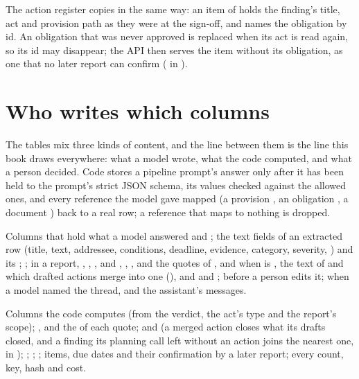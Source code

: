 The action register copies in the same way: an item of  holds the
finding's title, act and provision path as they were at the sign-off, and names the obligation
by id. An obligation that was never approved is replaced when its act is read again, so its id
may disappear; the API then serves the item without its obligation, as one that no later
report can confirm ( in ).

\section{Who writes which columns}\label{sec:data:writers}

The tables mix three kinds of content, and the line between them is the line this book draws
everywhere: what a model wrote, what the code computed, and what a person decided. Code stores
a pipeline prompt's answer only after it has been held to the prompt's strict JSON schema, its
values checked against the allowed ones, and every reference the model gave mapped (a provision , an obligation , a document ) back to a real
row; a reference that maps to nothing is dropped.

\begin{aibox}{Columns that hold what a model answered}
 and ; the text fields of an extracted
 row (title, text, addressee, conditions, deadline, evidence, category,
severity, ) and its ; ;
in a report, , , ,
 and , ,
,  and the quotes of ,
 and  when  is ,
the text of  and which drafted actions merge into one
(), and  and ;
 before a person edits it;  when a model
named the thread, and the assistant's messages.
\end{aibox}

\begin{codebox}{Columns the code computes}
 (from the verdict, the act's type and the report's scope);
,  and the  of each quote;
 and  (a merged action closes what its drafts
closed, and a finding its planning call left without an action joins the nearest one,
 in ); ;
; ; 
items, due dates and their confirmation by a later report; every count, key, hash and cost.
\end{codebox}

